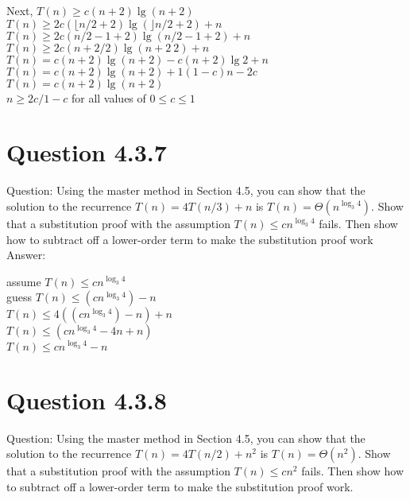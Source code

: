 \documentclass[12pt]{article}
\begin{document}
Next, $T(n) \ge c(n + 2)\lg(n + 2)$ \\ 

$T(n) \ge 2c(\lfloor n / 2 + 2 ) \lg (\rfloor n / 2 + 2) + n$ \\

$T(n) \ge 2c(n / 2 -1 + 2 ) \lg (n / 2 -1 + 2) + n$ \\

$T(n) \ge 2c(n + 2 / 2 ) \lg (n + 2 \ 2 ) + n$ \\

$T(n) = c(n+2) \lg (n + 2) - c (n + 2) \lg 2 + n$ \\

$T(n) = c(n+2) \lg (n + 2) + 1 (1 - c)n - 2c $ \\
$T(n) = c(n+2) \lg (n + 2)$ \\

$n \ge 2c/1-c$ for all values of $ 0 \le c \le 1$


\section{Question 4.3.7}
Question: Using the master method in Section 4.5, you can show that the solution to the recurrence $T(n) = 4T(n / 3) + n$ is $T(n) = \Theta(n^{\log_3 4})$. Show that a substitution proof with the assumption $T(n) \le cn^{\log_3 4}$ fails. Then show how to subtract off a lower-order term to make the substitution proof work \\

Answer: 

assume $T(n) \le cn^{\log_3 4}$ \\ 
guess $T(n) \le (cn^{\log_3 4 } ) - n$ \\

$T(n) \le 4((cn^{\log_3 4 } ) - n )+ n$   \\

$T(n) \le (cn^{\log_3 4 } - 4n + n) $ \\

$T(n) \le cn^{\log_3 4 }- n$ 

\section{Question 4.3.8}
Question: Using the master method in Section 4.5, you can show that the solution to the recurrence $T(n) = 4T(n / 2) + n^2$ is $T(n) = \Theta(n^2)$. Show that a substitution proof with the assumption $T(n) \le cn^2$ fails. Then show how to subtract off a lower-order term to make the substitution proof work. 
\end{document}
